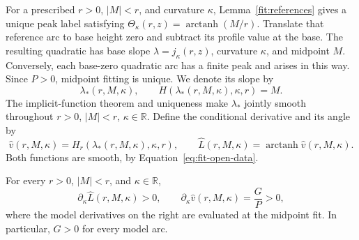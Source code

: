 For a prescribed \(r>0\), \(|M|<r\), and curvature \(\kappa\),
Lemma~\ref{fit:references} gives a unique peak label satisfying
\(\Theta_\kappa(r,z)=\operatorname{arctanh}(M/r)\).
Translate that reference arc to base height zero and subtract its
profile value at the base.  The resulting quadratic has base slope
\(\lambda=j_\kappa(r,z)\), curvature \(\kappa\), and midpoint \(M\).
Conversely, each base-zero quadratic arc has a finite peak and
arises in this way.  Since \(P>0\), midpoint fitting is unique.
We denote its slope by
\begin{equation}\label{eq:fit-midpoint-slope}
 \lambda_*(r,M,\kappa),\qquad
 H(\lambda_*(r,M,\kappa),\kappa,r)=M.
\end{equation}
The implicit-function theorem and uniqueness make \(\lambda_*\)
jointly smooth throughout \(r>0\), \(|M|<r\), \(\kappa\in\mathbb R\).
Define the conditional derivative and its angle by
\begin{equation}\label{eq:fit-conditional-data}
 \widehat v(r,M,\kappa)
  =H_r(\lambda_*(r,M,\kappa),\kappa,r),\qquad
 \widehat L(r,M,\kappa)=\operatorname{arctanh}\widehat v(r,M,\kappa).
\end{equation}
Both functions are smooth, by Equation~\eqref{eq:fit-open-data}.

\begin{lemma}\label{fit:conditional-derivative}
For every \(r>0\), \(|M|<r\), and \(\kappa\in\mathbb R\),
\begin{equation}\label{eq:fit-conditional-positive}
 \partial_\kappa\widehat L(r,M,\kappa)>0,
 \qquad
 \partial_\kappa\widehat v(r,M,\kappa)=\frac GP>0,
\end{equation}
where the model derivatives on the right are evaluated at the
midpoint fit.  In particular, \(G>0\) for every model arc.
\end{lemma}


